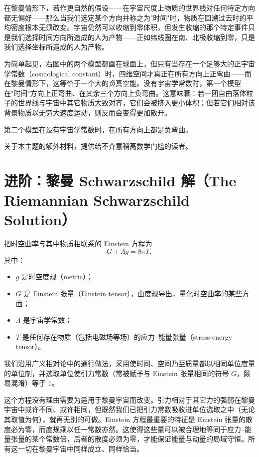 在黎曼情形下，若作更自然的假设——在宇宙尺度上物质的世界线对任何特定方向都无偏好——那么当我们选定某个方向并称之为"时间"时，物质在回溯过去时的平均密度根本无须改变。宇宙仍然可以收缩到零体积，但发生收缩的那个特定事件只是我们选择时间方向所造成的人为产物——正如纬线圈在南、北极收缩到零，只是我们选择坐标所造成的人为产物。

为简单起见，右图中的两个模型都画在球面上，但只有当存在一个足够大的正宇宙学常数（cosmological constant）时，四维空间才真正在所有方向上正弯曲——而在黎曼情形下，这等价于一个大的\emph{负}真空能。没有宇宙学常数时，第一个模型在"时间"方向上正弯曲、在其余三个方向上负弯曲。这意味着：若一团自由落体粒子的世界线与宇宙中其它物质大致对齐，它们会被挤入更小体积；但若它们相对该背景物质以无穷大速度运动，则反而会变得更加散开。

第二个模型在没有宇宙学常数时，在所有方向上都是负弯曲。

关于本主题的额外材料，提供给不介意稍高数学门槛的读者。

\section{进阶：黎曼 Schwarzschild 解（The Riemannian Schwarzschild Solution）}

把时空曲率与其中物质相联系的 Einstein 方程为
\begin{equation*}
G+\Lambda g=8\pi T,
\end{equation*}
其中：

\begin{itemize}
  \item $g$ 是时空度规（metric）；
  \item $G$ 是 Einstein 张量（Einstein tensor），由度规导出，量化时空曲率的某些方面；
  \item $\Lambda$ 是宇宙学常数；
  \item $T$ 是任何存在物质（包括电磁场等场）的应力--能量张量（stress-energy tensor）。
\end{itemize}

我们沿用广义相对论中的通行做法，采用使时间、空间乃至质量都以相同单位度量的单位制，并选取单位使引力常数（常被赋予与 Einstein 张量相同的符号 $G$，颇易混淆）等于 $1$。

这个方程没有理由需要为适用于黎曼宇宙而改变。引力相对于其它力的强弱在黎曼宇宙中或许不同、或许相同，但既然我们已把引力常数吸收进单位选取之中（无论其取值为何），就再无别的可做。Einstein 方程最重要的特征是 Einstein 张量的散度必为零，而度规乘以任一常数亦然。这使得这些量可以被合理地等同于应力--能量张量的某个常数倍，后者的散度必须为零，才能保证能量与动量的局域守恒。所有这一切在黎曼宇宙中同样成立、同样恰当。

